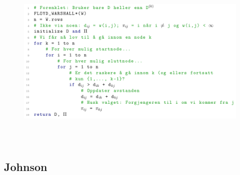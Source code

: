 \documentclass[12pt]{report}
\begin{document}

\par


\vspace{\baselineskip}



\begin{figure}[H]
	\begin{Center}
		\includegraphics[width=6.3in,height=3.38in]{./media/image199.png}
	\end{Center}
\end{figure}






\newpage
\par

\subsection*{Johnson}


\end{document}
